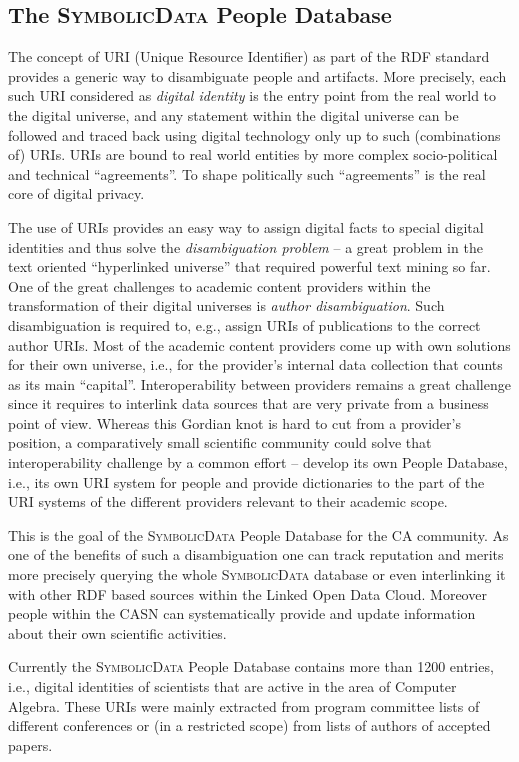 \documentclass{mathincs}
\newcommand{\SD}{\textsc{Symbo\-lic\-Data}}
\begin{document}
\subsection{The {\SD} People Database}

The concept of URI (Unique Resource Identifier) as part of the RDF standard
provides a generic way to disambiguate people and artifacts.  More precisely,
each such URI considered as \emph{digital identity} is the entry point from
the real world to the digital universe, and any statement within the digital
universe can be followed and traced back using digital technology only up to
such (combinations of) URIs. URIs are bound to real world entities by more
complex socio-political and technical ``agreements''. To shape politically
such ``agreements'' is the real core of digital privacy.

The use of URIs provides an easy way to assign digital facts to special
digital identities and thus solve the \emph{disambiguation problem} -- a great
problem in the text oriented ``hyperlinked universe'' that required powerful
text mining so far.  One of the great challenges to academic content providers
within the transformation of their digital universes is \emph{author
  disambiguation}. Such disambiguation is required to, e.g., assign URIs of
publications to the correct author URIs.  Most of the academic content
providers come up with own solutions for their own universe, i.e., for the
provider's internal data collection that counts as its main ``capital''.
Interoperability between providers remains a great challenge since it requires
to interlink data sources that are very private from a business point of view.
Whereas this Gordian knot is hard to cut from a provider's position, a
comparatively small scientific community could solve that interoperability
challenge by a common effort -- develop its own People Database, i.e., its own
URI system for people and provide dictionaries to the part of the URI systems
of the different providers relevant to their academic scope.

This is the goal of the {\SD} People Database for the CA community.  As one of
the benefits of such a disambiguation one can track reputation and merits more
precisely querying the whole {\SD} database or even interlinking it with other
RDF based sources within the Linked Open Data Cloud. Moreover people within
the CASN can systematically provide and update information about their own
scientific activities.

Currently the {\SD} People Database contains more than 1200 entries, i.e.,
digital identities of scientists that are active in the area of Computer
Algebra.  These URIs were mainly extracted from program committee lists of
different conferences or (in a restricted scope) from lists of authors of
accepted papers.
\end{document}
